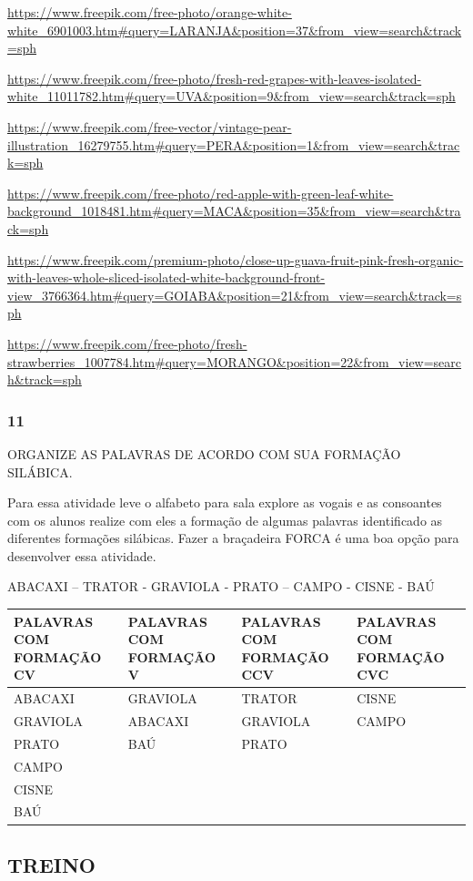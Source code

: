 \url{https://www.freepik.com/free-photo/orange-white-white_6901003.htm\#query=LARANJA\&position=37\&from_view=search\&track=sph}

\url{https://www.freepik.com/free-photo/fresh-red-grapes-with-leaves-isolated-white_11011782.htm\#query=UVA\&position=9\&from_view=search\&track=sph}

\url{https://www.freepik.com/free-vector/vintage-pear-illustration_16279755.htm\#query=PERA\&position=1\&from_view=search\&track=sph}

\url{https://www.freepik.com/free-photo/red-apple-with-green-leaf-white-background_1018481.htm\#query=MACA\&position=35\&from_view=search\&track=sph}

\url{https://www.freepik.com/premium-photo/close-up-guava-fruit-pink-fresh-organic-with-leaves-whole-sliced-isolated-white-background-front-view_3766364.htm\#query=GOIABA\&position=21\&from_view=search\&track=sph}

\url{https://www.freepik.com/free-photo/fresh-strawberries_1007784.htm\#query=MORANGO\&position=22\&from_view=search\&track=sph}

\subsubsection{11}\label{section-25}

ORGANIZE AS PALAVRAS DE ACORDO COM SUA FORMAÇÃO SILÁBICA.

Para essa atividade leve o alfabeto para sala explore as vogais e as
consoantes com os alunos realize com eles a formação de algumas palavras
identificado as diferentes formações silábicas. Fazer a braçadeira FORCA
é uma boa opção para desenvolver essa atividade.

ABACAXI -- TRATOR - GRAVIOLA - PRATO -- CAMPO - CISNE - BAÚ

\begin{longtable}[]{@{}llll@{}}
\toprule
\textbf{PALAVRAS COM FORMAÇÃO CV} & \textbf{PALAVRAS COM FORMAÇÃO V} &
\textbf{PALAVRAS COM FORMAÇÃO CCV} & \textbf{PALAVRAS COM FORMAÇÃO
CVC}\tabularnewline
\midrule
\endhead
ABACAXI & GRAVIOLA & TRATOR & CISNE\tabularnewline
GRAVIOLA & ABACAXI & GRAVIOLA & CAMPO\tabularnewline
PRATO & BAÚ & PRATO &\tabularnewline
CAMPO & & &\tabularnewline
CISNE & & &\tabularnewline
BAÚ & & &\tabularnewline
\bottomrule
\end{longtable}

\protect\hypertarget{_Hlk128577322}{}{}

\subsection{TREINO}\label{treino-1}

